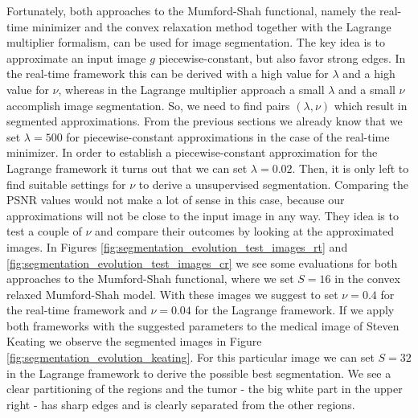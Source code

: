 \documentclass[abstracton]{scrreprt}
\begin{document}
            Fortunately, both approaches to the Mumford-Shah functional, namely the real-time minimizer and the convex relaxation method together with the Lagrange multiplier formalism, can be used for image segmentation. The key idea is to approximate an input image $g$ piecewise-constant, but also favor strong edges. In the real-time framework this can be derived with a high value for $\lambda$ and a high value for $\nu$, whereas in the Lagrange multiplier approach a small $\lambda$ and a small $\nu$ accomplish image segmentation. So, we need to find pairs $(\lambda, \nu)$ which result in segmented approximations. From the previous sections we already know that we set $\lambda = 500$ for piecewise-constant approximations in the case of the real-time minimizer. In order to establish a piecewise-constant approximation for the Lagrange framework it turns out that we can set $\lambda = 0.02$. Then, it is only left to find suitable settings for $\nu$ to derive a unsupervised segmentation. Comparing the PSNR values would not make a lot of sense in this case, because our approximations will not be close to the input image in any way. They idea is to test a couple of $\nu$ and compare their outcomes by looking at the approximated images. In Figures \ref{fig:segmentation_evolution_test_images_rt} and \ref{fig:segmentation_evolution_test_images_cr} we see some evaluations for both approaches to the Mumford-Shah functional, where we set $S = 16$ in the convex relaxed Mumford-Shah model. With these images we suggest to set $\nu = 0.4$ for the real-time framework and $\nu = 0.04$ for the Lagrange framework. If we apply both frameworks with the suggested parameters to the medical image of Steven Keating we observe the segmented images in Figure \ref{fig:segmentation_evolution_keating}. For this particular image we can set $S = 32$ in the Lagrange framework to derive the possible best segmentation. We see a clear partitioning of the regions and the tumor - the big white part in the upper right - has sharp edges and is clearly separated from the other regions.\newpage
\end{document}
